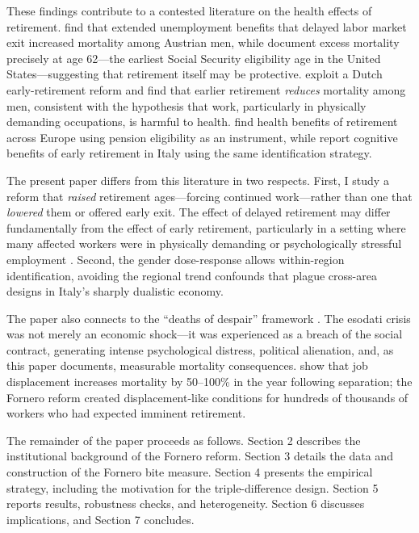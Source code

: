 \documentclass[12pt]{article}
\begin{document}
These findings contribute to a contested literature on the health effects of retirement. \citet{kuhn2020} find that extended unemployment benefits that delayed labor market exit increased mortality among Austrian men, while \citet{fitzpatrick2018} document excess mortality precisely at age 62---the earliest Social Security eligibility age in the United States---suggesting that retirement itself may be protective. \citet{bloemen2017} exploit a Dutch early-retirement reform and find that earlier retirement \textit{reduces} mortality among men, consistent with the hypothesis that work, particularly in physically demanding occupations, is harmful to health. \citet{coe2011} find health benefits of retirement across Europe using pension eligibility as an instrument, while \citet{mazzonna2017} report cognitive benefits of early retirement in Italy using the same identification strategy.

The present paper differs from this literature in two respects. First, I study a reform that \textit{raised} retirement ages---forcing continued work---rather than one that \textit{lowered} them or offered early exit. The effect of delayed retirement may differ fundamentally from the effect of early retirement, particularly in a setting where many affected workers were in physically demanding or psychologically stressful employment \citep{insler2014, hallberg2015}. Second, the gender dose-response allows within-region identification, avoiding the regional trend confounds that plague cross-area designs in Italy's sharply dualistic economy.

The paper also connects to the ``deaths of despair'' framework \citep{case2015}. The esodati crisis was not merely an economic shock---it was experienced as a breach of the social contract, generating intense psychological distress, political alienation, and, as this paper documents, measurable mortality consequences. \citet{sullivan2009} show that job displacement increases mortality by 50--100\% in the year following separation; the Fornero reform created displacement-like conditions for hundreds of thousands of workers who had expected imminent retirement.

The remainder of the paper proceeds as follows. Section 2 describes the institutional background of the Fornero reform. Section 3 details the data and construction of the Fornero bite measure. Section 4 presents the empirical strategy, including the motivation for the triple-difference design. Section 5 reports results, robustness checks, and heterogeneity. Section 6 discusses implications, and Section 7 concludes.
\end{document}
